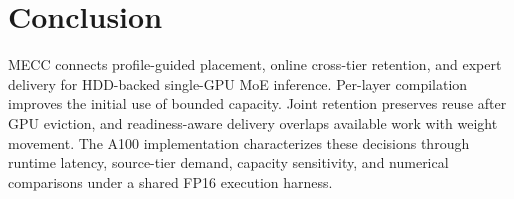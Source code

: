 \documentclass[conference,9pt,letterpaper]{IEEEtran}
\begin{document}
\section{Conclusion}
MECC connects profile-guided placement, online cross-tier retention, and expert delivery for HDD-backed single-GPU MoE inference. Per-layer compilation improves the initial use of bounded capacity. Joint retention preserves reuse after GPU eviction, and readiness-aware delivery overlaps available work with weight movement. The A100 implementation characterizes these decisions through runtime latency, source-tier demand, capacity sensitivity, and numerical comparisons under a shared FP16 execution harness.

\clearpage
\nobalance
{}


\end{document}
